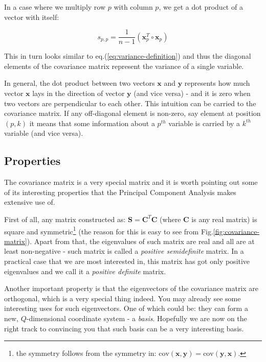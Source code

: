 \documentclass[10pt,twocolumn]{article}
\begin{document}
In a case where we multiply row $p$ with column $p$, we get a dot product of a vector with itself:

\begin{equation}
s_{p,p} = \frac{1}{n-1} ( \bm{x}_p^T \circ \bm{x}_p)
\end{equation}

This in turn looks similar to eq.(\ref{eq:variance-definition}) and thus the diagonal elements of the covariance matrix represent the variance of a single variable.

In general, the dot product between two vectors $\bm{x}$ and $\bm{y}$ represents how much vector $\bm{x}$ lays in the direction of vector $\bm{y}$ (and vice versa) - and it is zero when two vectors are perpendicular to each other. This intuition can be carried to the covariance matrix. If any off-diagonal element is non-zero, say element at position $(p,k)$ it means that some information about a $p^{th}$ variable is carried by a $k^{th}$ variable (and vice versa).

\subsection{Properties} \label{sec:covariance-properties}

The covariance matrix is a very special matrix and it is worth pointing out some of its interesting properties that the Principal Component Analysis makes extensive use of.

First of all, any matrix constructed as: $\bm{S} = \bm{C}^T \bm{C}$ (where $\bm{C}$ is any real matrix) is square and symmetric\footnote{the symmetry follows from the symmetry in: $\text{cov}(\bm{x},\bm{y}) = \text{cov}(\bm{y},\bm{x})$.} (the reason for this is easy to see from Fig.\ref{fig:covariance-matrix}). Apart from that, the eigenvalues of such matrix are real and all are at least non-negative - such matrix is called a \textit{positive semidefinite} matrix. In a practical case that we are most interested in, this matrix has got only positive eigenvalues and we call it a \textit{positive definite} matrix.

Another important property is that the eigenvectors of the covariance matrix are orthogonal, which is a very special thing indeed. You may already see some interesting uses for such eigenvectors. One of which could be: they can form a new, $Q$-dimensional coordinate system - a \textit{basis}. Hopefully we are now on the right track to convincing you that such basis can be a very interesting basis.
\end{document}
